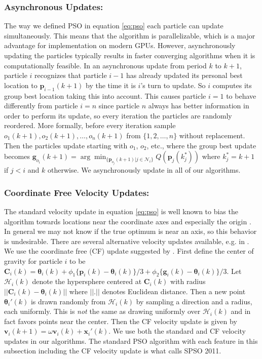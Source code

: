 \documentclass[cmbright]{staauth}
\begin{document}
\subsubsection{Asynchronous Updates:}
The way we defined PSO in equation \eqref{eq:pso} each particle can update simultaneously. This means that the algorithm is parallelizable, which is a major advantage for implementation on modern GPUs. However, asynchronously updating the particles typically results in faster converging algorithms when it is computationally feasible. In an asynchronous update from period $k$ to $k+1$, particle $i$ recognizes that particle $i-1$ has already updated its personal best location to $\bm{p}_{i-1}(k+1)$ by the time it is $i$'s turn to update. So $i$ computes its group best location taking this into account. This causes particle $i=1$ to behave differently from particle $i=n$ since particle $n$ always has better information in order to perform its update, so every iteration the particles are randomly reordered. More formally, before every iteration sample $o_1(k+1), o_2(k+1), \dots, o_{n}(k+1)$ from $\{1,2,\dots,n\}$ without replacement. Then the particles update starting with $o_1$, $o_2$, etc., where the group best update becomes $\bm{g}_{o_i}(k+1) = \arg\min_{\{\bm{p}_{o_j}(k+1)|j\in\mathcal{N}_i\}}Q(\bm{p}_j(k_j^*))$ where $k^*_j=k+1$ if $j<i$ and $k$ otherwise. We asynchronously update in all of our algorithms.

\subsubsection{Coordinate Free Velocity Updates:}
The standard velocity update in equation \eqref{eq:pso} is well known to bias the algorithm towards locations near the coordinate axes and especially the origin \citep{monson2005exposing,spears2010biases}. In general we may not know if the true optimum is near an axis, so this behavior is undesirable. There are several alternative velocity updates available, e.g. in \citet{monson2005exposing}. We use the coordinate free (CF) update suggested by \citet{clerc2011spso}. First define the center of gravity for particle $i$ to be $\bm{C}_i(k) = \bm{\theta}_i(k) + \phi_1\{\bm{p}_i(k) - \bm{\theta}_i(k)\}/3 + \phi_2\{\bm{g}_i(k) - \bm{\theta}_i(k)\}/3$. Let $\mathcal{H}_i(k)$ denote the hypersphere centered at $\bm{C}_i(k)$ with radius $||\bm{C}_i(k) - \bm{\theta}_i(k)||$ where $||.||$ denotes Euclidean distance. Then a new point $\bm{\theta}_i'(k)$ is drawn randomly from $\mathcal{H}_i(k)$ by sampling a direction and a radius, each uniformly. This is \emph{not} the same as drawing uniformly over $\mathcal{H}_i(k)$ and in fact favors points near the center. Then the CF velocity update is given by $\bm{v}_i(k+1) = \omega \bm{v}_i(k) + \bm{x}_i'(k)$. We use both the standard and CF velocity updates in our algorithms. The standard PSO algorithm with each feature in this subsection including the CF velocity update is what \citet{clerc2011spso} calls SPSO 2011. 
\end{document}
